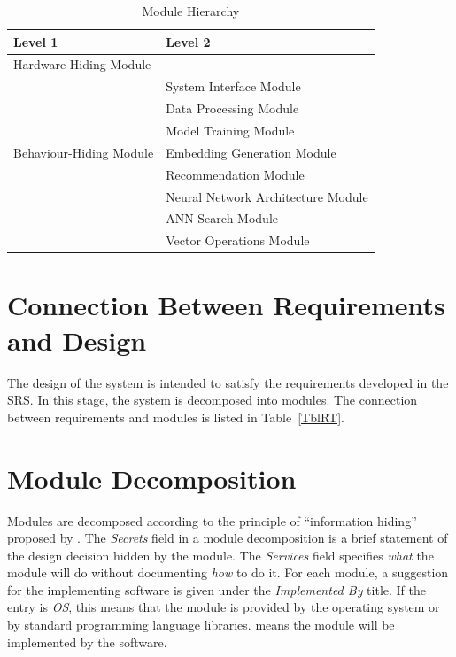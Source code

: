 \documentclass[12pt, titlepage]{article}
\begin{document}
\begin{table}[h!]
\centering
\begin{tabular}{p{} p{}}
\toprule
\textbf{Level 1} & \textbf{Level 2}\\
\midrule

{Hardware-Hiding Module} & ~ \\
\midrule

\multirow{7}{0.3\textwidth}{Behaviour-Hiding Module} 
& System Interface Module\\
& Data Processing Module\\
& Model Training Module\\
& Embedding Generation Module\\
& Recommendation Module\\
\midrule

\multirow{3}{0.3\textwidth}{Software Decision Module} & {Neural Network Architecture Module}\\
& ANN Search Module\\
& Vector Operations Module\\
\bottomrule

\end{tabular}
\caption{Module Hierarchy}
\label{TblMH}
\end{table}

\section{Connection Between Requirements and Design} \label{SecConnection}

The design of the system is intended to satisfy the requirements developed in
the SRS. In this stage, the system is decomposed into modules. The connection
between requirements and modules is listed in Table~\ref{TblRT}.

\section{Module Decomposition} \label{SecMD}

Modules are decomposed according to the principle of ``information hiding''
proposed by \citet{ParnasEtAl1984}. The \emph{Secrets} field in a module
decomposition is a brief statement of the design decision hidden by the
module. The \emph{Services} field specifies \emph{what} the module will do
without documenting \emph{how} to do it. For each module, a suggestion for the
implementing software is given under the \emph{Implemented By} title. If the
entry is \emph{OS}, this means that the module is provided by the operating
system or by standard programming language libraries.  \emph{\progname{}} means the
module will be implemented by the \progname{} software.
\end{document}
